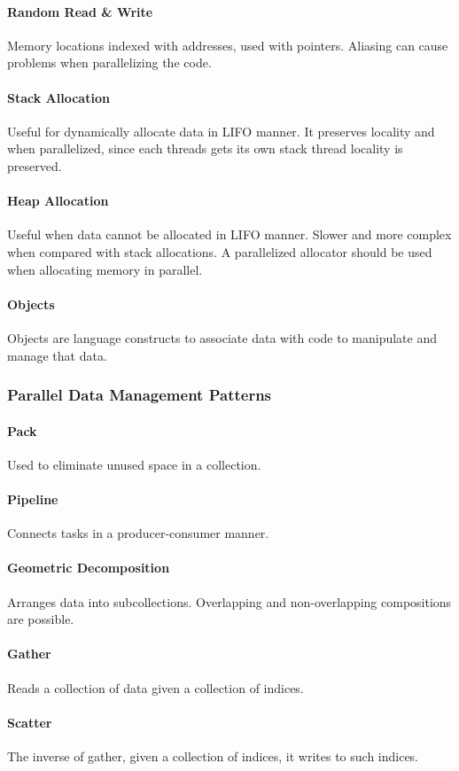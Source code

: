 \paragraph{Random Read \& Write}
Memory locations indexed with addresses, used with pointers.
Aliasing can cause problems when parallelizing the code.

\paragraph{Stack Allocation}
Useful for dynamically allocate data in LIFO manner.
It preserves locality and when parallelized, since each threads gets its own stack thread locality is preserved.

\paragraph{Heap Allocation}
Useful when data cannot be allocated in LIFO manner.
Slower and more complex when compared with stack allocations.
A parallelized allocator should be used when allocating memory in parallel.

\paragraph{Objects}
Objects are language constructs to associate data with code to manipulate and manage that data.

\subsubsection{Parallel Data Management Patterns}

\paragraph{Pack}
Used to eliminate unused space in a collection.

\paragraph{Pipeline}
Connects tasks in a producer-consumer manner.

\paragraph{Geometric Decomposition}
Arranges data into subcollections.
Overlapping and non-overlapping compositions are possible.

\paragraph{Gather}
Reads a collection of data given a collection of indices.

\paragraph{Scatter}
The inverse of gather, given a collection of indices, it writes to such indices.